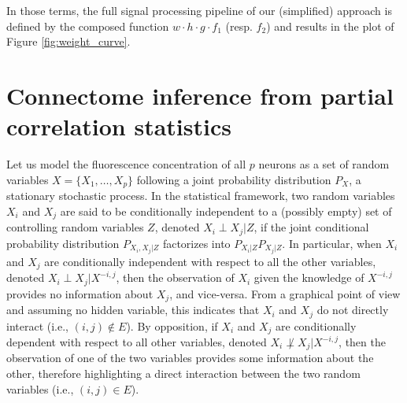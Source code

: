 \documentclass[wcp]{jmlr}
\begin{document}
In those terms, the full signal processing pipeline of our (simplified)
approach is defined by the composed function $w \cdot h \cdot g \cdot f_1$
(resp. $f_2$) and results in the plot of Figure \ref{fig:weight_curve}.


\section{Connectome inference from partial correlation statistics}
\label{sec:inference}

Let us model the fluorescence concentration of all $p$ neurons as a set of random
variables $X = \{X_1, \dots, X_p\}$ following a joint probability distribution
$P_X$, a stationary stochastic process.
In the statistical framework, two random variables $X_i$ and $X_j$ are
said to be conditionally independent to a (possibly empty) set of controlling
random variables $Z$, denoted $X_i \perp X_j | Z$, if the joint conditional
probability distribution $P_{X_i, X_j | Z}$ factorizes into $P_{X_i|Z}
P_{X_j|Z}$. In particular, when $X_i$ and $X_j$ are conditionally independent
with respect to all the other variables, denoted $X_i \perp X_j | X^{-i,j}$,
then the observation of $X_i$ given the knowledge of $X^{-i,j}$ provides no
information about $X_j$, and vice-versa. From a graphical point of view and
assuming no hidden variable, this indicates that $X_i$ and $X_j$ do not
directly interact (i.e., $(i,j) \notin E$). By opposition, if $X_i$ and $X_j$
are conditionally dependent with respect to all other variables, denoted $X_i
\not\perp X_j | X^{-i,j}$, then the observation of one of the two variables
provides some information about the other, therefore highlighting a direct
interaction between the two random variables (i.e., $(i, j) \in E$).
\end{document}
